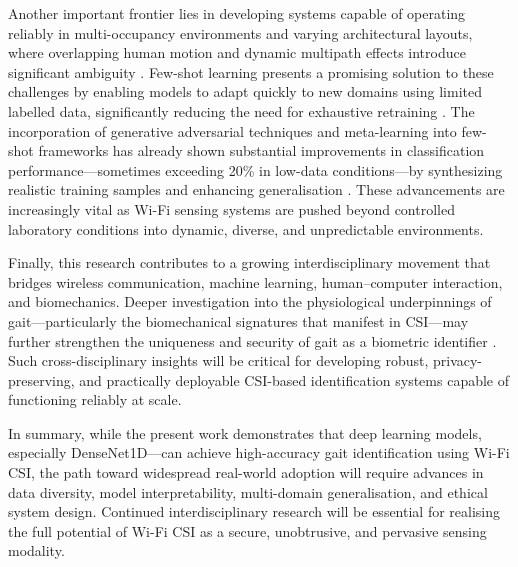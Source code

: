 Another important frontier lies in developing systems capable of operating reliably in multi-occupancy environments and varying architectural layouts, where overlapping human motion and dynamic multipath effects introduce significant ambiguity \parencite{rizk2025identifi}. Few-shot learning presents a promising solution to these challenges by enabling models to adapt quickly to new domains using limited labelled data, significantly reducing the need for exhaustive retraining \parencite{yang2023fewcross, li2025wififewshot}. The incorporation of generative adversarial techniques and meta-learning into few-shot frameworks has already shown substantial improvements in classification performance—sometimes exceeding 20\% in low-data conditions—by synthesizing realistic training samples and enhancing generalisation \parencite{bahadori2022rewis, yang2022metapose}. These advancements are increasingly vital as Wi-Fi sensing systems are pushed beyond controlled laboratory conditions into dynamic, diverse, and unpredictable environments.

Finally, this research contributes to a growing interdisciplinary movement that bridges wireless communication, machine learning, human–computer interaction, and biomechanics. Deeper investigation into the physiological underpinnings of gait—particularly the biomechanical signatures that manifest in CSI—may further strengthen the uniqueness and security of gait as a biometric identifier \parencite{mosharaf2024wifiid}. Such cross-disciplinary insights will be critical for developing robust, privacy-preserving, and practically deployable CSI-based identification systems capable of functioning reliably at scale.

In summary, while the present work demonstrates that deep learning models, especially DenseNet1D—can achieve high-accuracy gait identification using Wi-Fi CSI, the path toward widespread real-world adoption will require advances in data diversity, model interpretability, multi-domain generalisation, and ethical system design. Continued interdisciplinary research will be essential for realising the full potential of Wi-Fi CSI as a secure, unobtrusive, and pervasive sensing modality.


